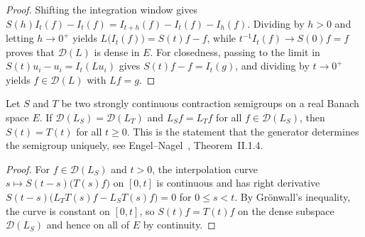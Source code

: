 \begin{proof}
\leanok
Shifting the integration window gives $S(h) I_t(f) - I_t(f) = I_{t+h}(f) - I_t(f) - I_h(f)$. Dividing by $h > 0$ and letting $h \to 0^+$ yields $L\bigl(I_t(f)\bigr) = S(t)f - f$, while $t^{-1} I_t(f) \to S(0)f = f$ proves that $\mathcal{D}(L)$ is dense in $E$. For closedness, passing to the limit in $S(t)u_i - u_i = I_t(L u_i)$ gives $S(t)f - f = I_t(g)$, and dividing by $t \to 0^+$ yields $f \in \mathcal{D}(L)$ with $Lf = g$.
\end{proof}

\begin{theorem}\label{thm:c0_generator_uniqueness}
\leanok
Let $S$ and $T$ be two strongly continuous contraction semigroups on a real Banach space $E$. If $\mathcal{D}(L_S) = \mathcal{D}(L_T)$ and $L_S f = L_T f$ for all $f \in \mathcal{D}(L_S)$, then $S(t) = T(t)$ for all $t \ge 0$. This is the statement that the generator determines the semigroup uniquely, see Engel--Nagel~\cite{engel}, Theorem~II.1.4.
\end{theorem}

\begin{proof}
\leanok
For $f \in \mathcal{D}(L_S)$ and $t > 0$, the interpolation curve $s \mapsto S(t - s)\bigl(T(s)f\bigr)$ on $[0, t]$ is continuous and has right derivative $S(t - s)\bigl(L_T T(s)f - L_S T(s)f\bigr) = 0$ for $0 \le s < t$. By Gr\"onwall's inequality, the curve is constant on $[0, t]$, so $S(t)f = T(t)f$ on the dense subspace $\mathcal{D}(L_S)$ and hence on all of $E$ by continuity.
\end{proof}
